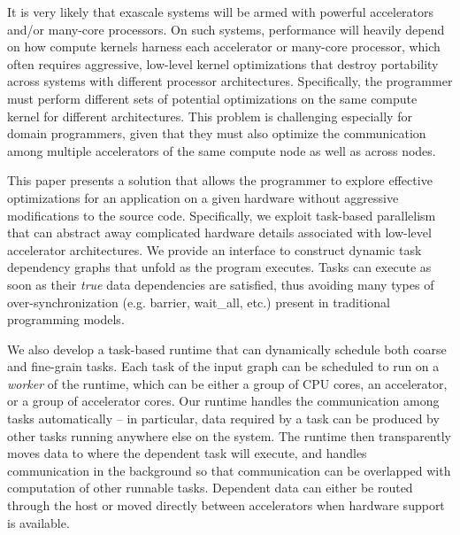 It is very likely that exascale systems will be armed with powerful accelerators and/or many-core processors.%
On such systems, performance will heavily depend on how compute kernels harness each accelerator or many-core processor, which often requires aggressive, low-level kernel optimizations that destroy portability across systems with different processor architectures.
Specifically, the programmer must perform different sets of potential optimizations on the same compute kernel for different architectures.
This problem is challenging especially for domain programmers, given that they must also optimize the communication among multiple accelerators of the same compute node as well as across nodes.

This paper presents a solution that allows the programmer to explore effective optimizations for an application on a given hardware without aggressive modifications to the source code. 
Specifically, we exploit task-based parallelism that can abstract away complicated hardware details associated with low-level accelerator architectures.
We provide an interface to construct dynamic task dependency graphs that unfold as the program executes. 
Tasks can execute as soon as their {\em true} data dependencies are satisfied, thus avoiding many types of over-synchronization (e.g. barrier, wait\_all, etc.) present in traditional programming models.

We also develop a task-based runtime that can dynamically schedule both coarse and fine-grain tasks.
Each task of the input graph can be scheduled to run on a {\em worker} of the runtime, which can be either a group of CPU cores, an accelerator, or a group of accelerator cores.
Our runtime handles the communication among tasks automatically -- in particular, data required by a task can be produced by other tasks running anywhere else on the system.
The runtime then transparently moves data to where the dependent task will execute, and handles communication in the background so that communication can be overlapped with computation of other runnable tasks.
Dependent data can either be routed through the host or moved directly between accelerators when hardware support is available.

